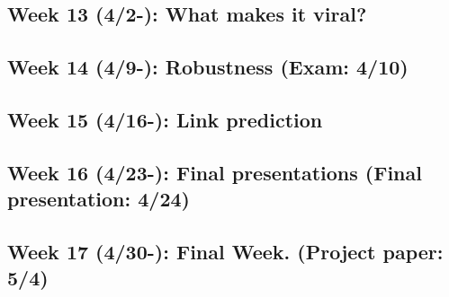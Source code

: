 \documentclass[11pt,article,oneside]{memoir} %
\begin{document}
\subsection{Week 13 (4/2-): What makes it viral?}
\subsection{Week 14 (4/9-): Robustness (Exam: 4/10)}
\subsection{Week 15 (4/16-): Link prediction}

\subsection{Week 16 (4/23-): Final presentations (Final presentation: 4/24)}
\subsection{Week 17 (4/30-): Final Week. (Project paper: 5/4)} 

\end{document}

